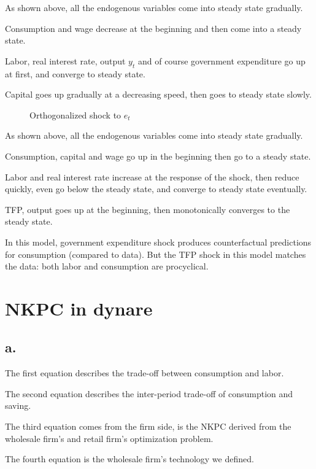 \documentclass{article}
\begin{document}
As shown above, all the endogenous variables come into steady state gradually. 

Consumption and wage decrease at the beginning and then come into a steady state. 

Labor, real interest rate, output $y_{t}$ and of course government expenditure go up at first, and converge to steady state. 

Capital goes up gradually at a decreasing speed, then goes to steady state slowly.

\begin{figure}[H]
  \centering
  
  \caption{Orthogonalized shock to $e_{t}$}
  \label{fig:figure2}
\end{figure}

As shown above, all the endogenous variables come into steady state gradually. 

Consumption, capital and wage go up in the beginning then go to a steady state. 

Labor and real interest rate increase at the response of the shock, then reduce quickly, even go below the steady state, and converge to steady state eventually. 

TFP, output goes up at the beginning, then monotonically converges to the steady state.

In this model, government expenditure shock produces counterfactual predictions for consumption (compared to data). But the TFP shock in this model matches the data: both labor and consumption are procyclical.

\section{NKPC in dynare}

\subsection*{a.}

The first equation describes the trade-off between consumption and labor.

The second equation describes the inter-period trade-off of consumption and saving.

The third equation comes from the firm side, is the NKPC derived from the wholesale firm's and retail firm's optimization problem.

The fourth equation is the wholesale firm's technology we defined. 
\end{document}
